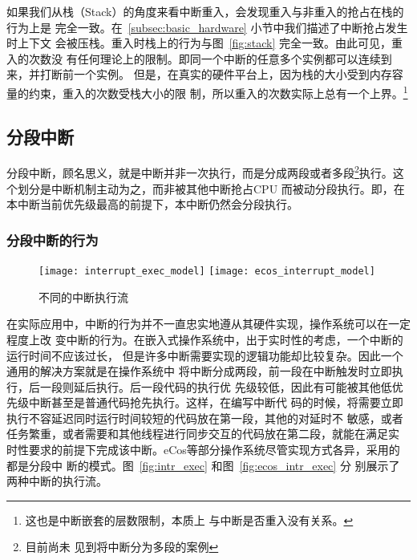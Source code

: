 如果我们从栈（Stack）的角度来看中断重入，会发现重入与非重入的抢占在栈的行为上是
完全一致。在~\ref{subsec:basic_hardware} 小节中我们描述了中断抢占发生时上下文
会被压栈。重入时栈上的行为与图~\ref{fig:stack} 完全一致。由此可见，重入的次数没
有任何理论上的限制。即同一个中断的任意多个实例都可以连续到来，并打断前一个实例。
但是，在真实的硬件平台上，因为栈的大小受到内存容量的约束，重入的次数受栈大小的限
制，所以重入的次数实际上总有一个上界。\footnote{这也是中断嵌套的层数限制，本质上
与中断是否重入没有关系。}

\subsection{分段中断}
\label{subsec:segment}

分段中断，顾名思义，就是中断并非一次执行，而是分成两段或者多段\footnote{目前尚未
见到将中断分为多段的案例}执行。这个划分是中断机制主动为之，而非被其他中断抢占CPU
而被动分段执行。即，在本中断当前优先级最高的前提下，本中断仍然会分段执行。

\subsubsection{分段中断的行为}
\label{subsubsec:segment_behavior}

\begin{figure}[H]
	\centering
	{\texttt{[image: interrupt\_exec\_model]}}
	\hspace{4em}%
	{\texttt{[image: ecos\_interrupt\_model]}}
	\caption{不同的中断执行流}
	\label{fig:two_intr_exec}
\end{figure}

在实际应用中，中断的行为并不一直忠实地遵从其硬件实现，操作系统可以在一定程度上改
变中断的行为。在嵌入式操作系统中，出于实时性的考虑，一个中断的运行时间不应该过长，
但是许多中断需要实现的逻辑功能却比较复杂。因此一个通用的解决方案就是在操作系统中
将中断分成两段，前一段在中断触发时立即执行，后一段则延后执行。后一段代码的执行优
先级较低，因此有可能被其他低优先级中断甚至是普通代码抢先执行。这样，在编写中断代
码的时候，将需要立即执行不容延迟同时运行时间较短的代码放在第一段，其他的对延时不
敏感，或者任务繁重，或者需要和其他线程进行同步交互的代码放在第二段，就能在满足实
时性要求的前提下完成该中断。eCos等部分操作系统尽管实现方式各异，采用的都是分段中
断的模式。\cite{ecos}图~\ref{fig:intr_exec} 和图~\ref{fig:ecos_intr_exec} 分
别展示了两种中断的执行流。

